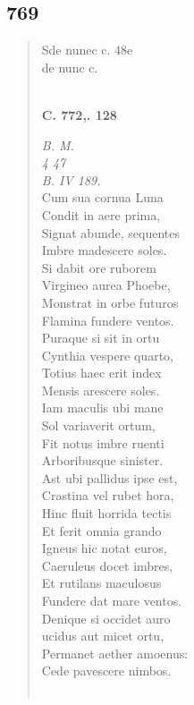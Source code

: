 \documentclass[11pt, a4paper]{report}
\begin{document}
            \subsection*{769}
      \begin{verse}
      Sde nunec c. 48e \\ de nunc c. \\ 
        ﻿\pagebreak 
     \marginpar{[254]} \begin{center} \textbf{C. 772,. 128} \end{center}\textit{B. M.} \\ \textit{4 47} \\ \textit{B. IV 189.} \\ Cum sua cornua Luna \\ Condit in aere prima, \\ Signat abunde, sequentes \\ Imbre madescere soles. \\ Si dabit ore ruborem \\ Virgineo aurea Phoebe, \\ Monstrat in orbe futuros \\ Flamina fundere ventos. \\ Puraque si sit in ortu \\ Cynthia vespere quarto, \\ Totius haec erit index \\ Mensis arescere soles. \\ Iam maculis ubi mane \\ Sol variaverit ortum, \\ Fit notus imbre ruenti \\ Arboribusque sinister. \\ Ast ubi pallidus ipse est, \\ Crastina vel rubet hora, \\ Hinc fluit horrida tectis \\ Et ferit omnia grando \\ Igneus hic notat euros, \\ Caeruleus docet imbres, \\ Et rutilans maculosus \\ Fundere dat mare ventos. \\ Denique si occidet auro \\ ucidus aut micet ortu, \\ Permanet aether amoenus: \\ Cede pavescere nimbos. \\ 
        ﻿\pagebreak 

\end{verse}
\end{document}
